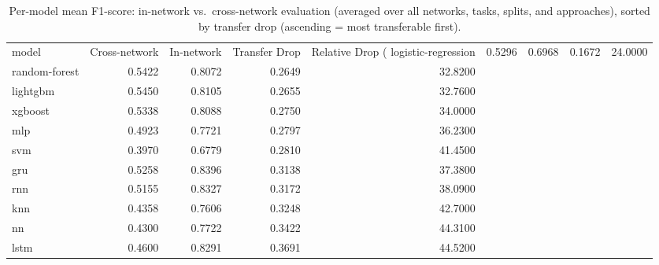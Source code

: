 \begin{table}
\caption{Per-model mean F1-score: in-network vs.\ cross-network evaluation (averaged over all networks, tasks, splits, and approaches), sorted by transfer drop (ascending = most transferable first).}
\label{tab:q3_per_model}
\begin{tabular}{lrrrr}
\toprule
model & Cross-network & In-network & Transfer Drop & Relative Drop (%
\midrule
logistic-regression & 0.5296 & 0.6968 & 0.1672 & 24.0000 \\
random-forest & 0.5422 & 0.8072 & 0.2649 & 32.8200 \\
lightgbm & 0.5450 & 0.8105 & 0.2655 & 32.7600 \\
xgboost & 0.5338 & 0.8088 & 0.2750 & 34.0000 \\
mlp & 0.4923 & 0.7721 & 0.2797 & 36.2300 \\
svm & 0.3970 & 0.6779 & 0.2810 & 41.4500 \\
gru & 0.5258 & 0.8396 & 0.3138 & 37.3800 \\
rnn & 0.5155 & 0.8327 & 0.3172 & 38.0900 \\
knn & 0.4358 & 0.7606 & 0.3248 & 42.7000 \\
nn & 0.4300 & 0.7722 & 0.3422 & 44.3100 \\
lstm & 0.4600 & 0.8291 & 0.3691 & 44.5200 \\
\bottomrule
\end{tabular}
\end{table}
